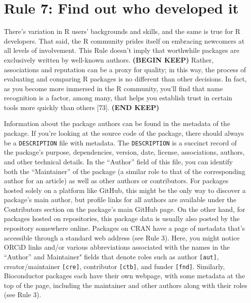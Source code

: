 \documentclass[10pt,letterpaper]{article}
\begin{document}
\hypertarget{rule-7-find-out-who-developed-it}{%
\section{Rule 7: Find out who developed
it}\label{rule-7-find-out-who-developed-it}}

There's variation in R users' backgrounds and skills, and the same is
true for R developers. That said, the R community prides itself on
embracing newcomers at all levels of involvement. This Rule doesn't
imply that worthwhile packages are exclusively written by well-known
authors. \textbf{(BEGIN KEEP)} Rather, associations and reputation can
be a proxy for quality; in this way, the process of evaluating and
comparing R packages is no different than other decisions. In fact, as
you become more immersed in the R community, you'll find that name
recognition is a factor, among many, that helps you establish trust in
certain tools more quickly than others {[}73{]}. \textbf{(END KEEP)}

Information about the package authors can be found in the metadata of
the package. If you're looking at the source code of the package, there
should always be a \texttt{DESCRIPTION} file with metadata. The
\texttt{DESCRIPTION} is a succinct record of the package's purpose,
dependencies, version, date, license, associations, authors, and other
technical details. In the ``Author'' field of this file, you can
identify both the ``Maintainer'' of the package (a similar role to that
of the corresponding author for an article) as well as other authors or
contributors. For packages hosted solely on a platform like GitHub, this
might be the only way to discover a package's main author, but profile
links for all authors are available under the Contributors section on
the package's main GitHub page. On the other hand, for packages hosted
on repositories, this package data is usually also posted by the
repository somewhere online. Packages on CRAN have a page of metadata
that's accessible through a standard web address (see Rule 3). Here, you
might notice ORCiD links and/or various abbreviations associated with
the names in the ``Author'' and Maintainer" fields that denote roles
such as author \texttt{{[}aut{]}}, creator/maintainer
\texttt{{[}cre{]}}, contributor \texttt{{[}ctb{]}}, and funder
\texttt{{[}fnd{]}}. Similarly, Bioconductor packages each have their own
webpage, with some metadata at the top of the page, including the
maintainer and other authors along with their roles (see Rule 3).
\end{document}
